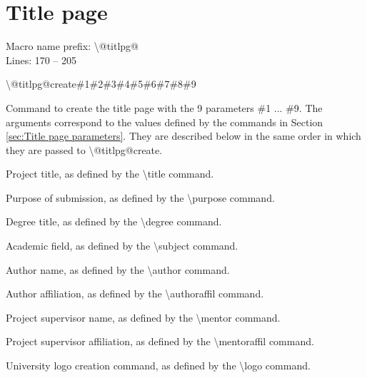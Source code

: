 \documentclass[twoside,openany]{thesis}
\begin{document}
\section{Title page}\label{sec:Title page}

Macro name prefix: {\ttfamily\textbackslash @titlpg@}\\
Lines: 170 -- 205

\begin{listing}

\item   {\ttfamily\textbackslash @titlpg@create\#1\#2\#3\#4\#5\#6\#7\#8\#9}

        Command to create the title page with the 9 parameters {\ttfamily\#1} ... {\ttfamily\#9}.
        The arguments correspond to the values defined by the commands in Section \ref{sec:Title page parameters}.
        They are described below in the same order in which they are passed to {\ttfamily\textbackslash @titlpg@create}.

        \begin{enumeration}

        \item   Project title, as defined by the {\ttfamily\textbackslash title} command.

        \item   Purpose of submission, as defined by the {\ttfamily\textbackslash purpose} command.

        \item   Degree title, as defined by the {\ttfamily\textbackslash degree} command.

        \item   Academic field, as defined by the {\ttfamily\textbackslash subject} command.

        \item   Author name, as defined by the {\ttfamily\textbackslash author} command.

        \item   Author affiliation, as defined by the {\ttfamily\textbackslash authoraffil} command.

        \item   Project supervisor name, as defined by the {\ttfamily\textbackslash mentor} command.

        \item   Project supervisor affiliation, as defined by the {\ttfamily\textbackslash mentoraffil} command.

        \item   University logo creation command, as defined by the {\ttfamily\textbackslash logo} command.

        \end{enumeration}

\end{listing}
\end{document}
